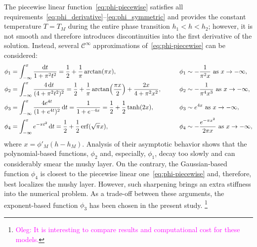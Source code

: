 \documentclass{article}
\newcommand{\oleg}[1]{\textcolor{magenta}{\footnote{\textcolor{magenta}{Oleg: #1}}}} %
\begin{document}
The piecewise linear function~\eqref{eq:phi-piecewise} satisfies all
requirements~\eqref{eq:phi_derivative}--\eqref{eq:phi_symmetric}
and provides the constant temperature $T=T_M$ during the entire phase transition $h_1<h<h_2$;
however, it is not smooth and therefore introduces discontinuities
into the first derivative of the solution.
Instead, several $\mathcal{C}^\infty$ approximations
of~\eqref{eq:phi-piecewise} can be considered:
\begin{alignat}{2}
    \phi_1 &= \int_{-\infty}^{x} \frac{\dd{t}}{1+\pi^2 t^2}
        = \frac12 + \frac1\pi\arctan(\pi x), \qquad
        &\phi_1 &\sim -\frac1{\pi^2x} \text{ as } x\to-\infty, \label{eq:phi1}\\
    \phi_2 &= \int_{-\infty}^{x} \frac{4\dd{t}}{(4+\pi^2 t^2)^2}
        = \frac12 + \frac1\pi\arctan(\frac{\pi x}2) + \frac{2x}{4+\pi^2x^2}, \qquad
        &\phi_2 &\sim -\frac1{\pi^4x^3} \text{ as } x\to-\infty, \label{eq:phi2}\\
    \phi_3 &= \int_{-\infty}^{x} \frac{4e^{4t}}{(1+e^{4t})^2}\dd{t}
        = \frac1{1+e^{-4x}} = \frac12 + \frac12\tanh(2x), \qquad
        &\phi_3 &\sim e^{4x} \text{ as } x\to-\infty, \label{eq:phi3}\\
    \phi_4 &= \int_{-\infty}^{x} e^{-\pi t^2}\dd{t} = \frac12 + \frac12\erf(\sqrt\pi x), \qquad
        &\phi_4 &\sim -\frac{e^{-\pi x^2}}{2\pi x} \text{ as } x\to-\infty, \label{eq:phi4}
\end{alignat}
where $x = \phi'_M(h-h_M)$.
Analysis of their asymptotic behavior shows that the polynomial-based functions, $\phi_2$
and, especially, $\phi_1$, decay too slowly and can considerably smear the mushy layer.
On the contrary, the Gaussian-based function $\phi_4$ is closest
to the piecewise linear one~\eqref{eq:phi-piecewise}
and, therefore, best localizes the mushy layer.
However, such sharpening brings an extra stiffness into the numerical problem.
As a trade-off between these arguments,
the exponent-based function $\phi_3$ has been chosen in the present study.
\oleg{It is interesting to compare results and computational cost for these models.}

\printbibliography
\end{document}

